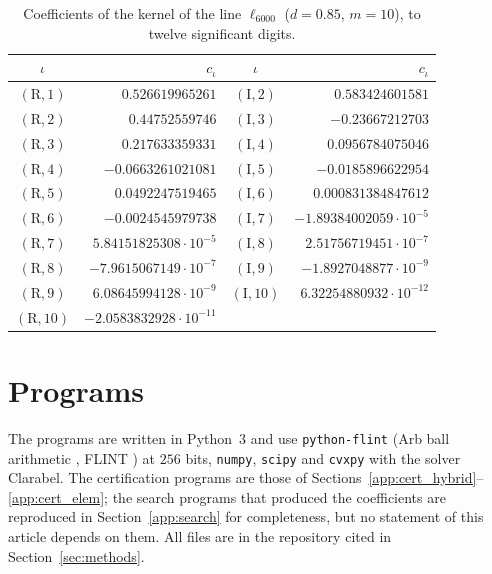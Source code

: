 \documentclass[11pt,reqno]{amsart}
\makeatletter
\let\CG@origcite\cite
\renewcommand*{\cite}[2][]{\def\CG@citekey{#2}%
  \ifx\relax#1\relax\CG@origcite{#2}\else\CG@origcite[#1]{#2}\fi}
\numberwithin{equation}{section}
\theoremstyle{definition}
\theoremstyle{remark}
\makeatother
\begin{document}
\begin{table}[ht]\centering\small
\begin{tabular}{@{}cr@{\quad}cr@{}}\toprule $\iota$ & $c_\iota$ & $\iota$ & $c_\iota$\\\midrule
$(\mathrm R,1)$ & $0.526619965261$ & $(\mathrm I,2)$ & $0.583424601581$\\
$(\mathrm R,2)$ & $0.44752559746$ & $(\mathrm I,3)$ & $-0.23667212703$\\
$(\mathrm R,3)$ & $0.217633359331$ & $(\mathrm I,4)$ & $0.0956784075046$\\
$(\mathrm R,4)$ & $-0.0663261021081$ & $(\mathrm I,5)$ & $-0.0185896622954$\\
$(\mathrm R,5)$ & $0.0492247519465$ & $(\mathrm I,6)$ & $0.000831384847612$\\
$(\mathrm R,6)$ & $-0.0024545979738$ & $(\mathrm I,7)$ & $-1.89384002059\cdot10^{-5}$\\
$(\mathrm R,7)$ & $5.84151825308\cdot10^{-5}$ & $(\mathrm I,8)$ & $2.51756719451\cdot10^{-7}$\\
$(\mathrm R,8)$ & $-7.9615067149\cdot10^{-7}$ & $(\mathrm I,9)$ & $-1.8927048877\cdot10^{-9}$\\
$(\mathrm R,9)$ & $6.08645994128\cdot10^{-9}$ & $(\mathrm I,10)$ & $6.32254880932\cdot10^{-12}$\\
$(\mathrm R,10)$ & $-2.0583832928\cdot10^{-11}$ & & \\
\bottomrule\end{tabular}
\caption{Coefficients of the kernel of the line $\ell_{6000}$ ($d=0.85$, $m=10$), to twelve significant digits.}\label{tab:kernel_D6000}\end{table}

\section{Programs}\label{app:code}
The programs are written in Python~3 and use \texttt{python-flint} (Arb ball arithmetic \cite{Johansson2017}, FLINT \cite{FLINT}) at $256$ bits, \texttt{numpy}, \texttt{scipy} and \texttt{cvxpy} with the solver Clarabel. The certification programs are those of Sections~\ref{app:cert_hybrid}--\ref{app:cert_elem}; the search programs that produced the coefficients are reproduced in Section~\ref{app:search} for completeness, but no statement of this article depends on them. All files are in the repository cited in Section~\ref{sec:methods}.
\end{document}

